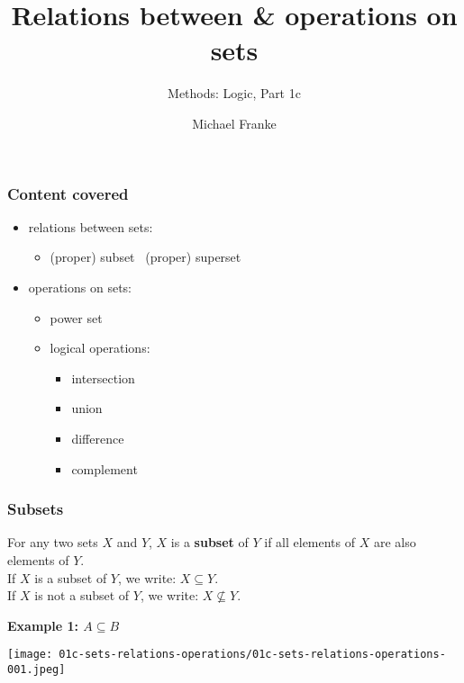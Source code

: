 \documentclass[fleqn,10pt,serif,xcolor=svgnames,xcolor=table,aspectratio=169]{beamer}
\title{Relations between \& operations on sets}
\subtitle{Methods: Logic, Part 1c}
\author{Michael Franke}
\date{}
\begin{document}

\abovedisplayskip=3pt
\abovedisplayshortskip=3pt

\belowdisplayskip=3pt
\belowdisplayshortskip=3pt

\begin{frame}
  \maketitle
\end{frame}

\begin{frame}
  \frametitle{Content covered}

  \begin{itemize}
    \item relations between sets:
    \begin{itemize}
      \item (proper) subset
      \ (proper) superset
    \end{itemize}
    \item operations on sets:
    \begin{itemize}
      \item power set
      \item logical operations:
      \begin{itemize}
        \item intersection
        \item union
        \item difference
        \item complement
      \end{itemize}
    \end{itemize}
  \end{itemize}
\end{frame}

\begin{frame}
  \frametitle{Subsets}

  For any two sets $X$ and $Y$, $X$ is a \textbf{subset} of $Y$ if all elements of $X$ are also elements of $Y$. \\
  If $X$ is a subset of $Y$, we write: $X \subseteq Y$.\\
  If $X$ is not a subset of $Y$, we write: $X \not \subseteq Y$.

  \pause

\hfill  \textbf{Example 1: $A \subseteq B$}

  \hfill \texttt{[image: 01c-sets-relations-operations/01c-sets-relations-operations-001.jpeg]}

\end{frame}
\end{document}

